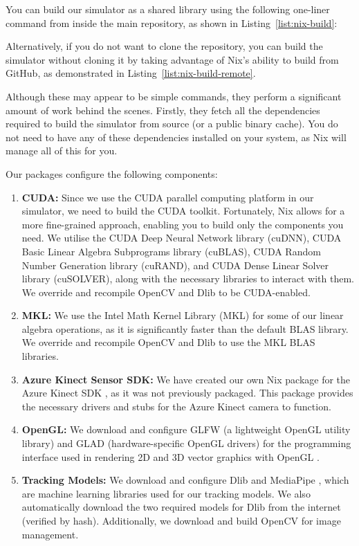 You can build our simulator as a shared library using the following one-liner command from inside the main repository, as shown in Listing~\ref{list:nix-build}:

Alternatively, if you do not want to clone the repository, you can build the simulator without cloning it by taking advantage of Nix's ability to build from GitHub, as demonstrated in Listing~\ref{list:nix-build-remote}.

Although these may appear to be simple commands, they perform a significant amount of work behind the scenes. Firstly, they fetch all the dependencies required to build the simulator from source (or a public binary cache). You do not need to have any of these dependencies installed on your system, as Nix will manage all of this for you.

Our packages configure the following components:
\begin{enumerate}
	\item \textbf{CUDA:} Since we use the CUDA parallel computing platform \cite{4541126} in our simulator, we need to build the CUDA toolkit. Fortunately, Nix allows for a more fine-grained approach, enabling you to build only the components you need. We utilise the CUDA Deep Neural Network library (cuDNN), CUDA Basic Linear Algebra Subprograms library (cuBLAS), CUDA Random Number Generation library (cuRAND), and CUDA Dense Linear Solver library (cuSOLVER), along with the necessary libraries to interact with them. We override and recompile OpenCV and Dlib to be CUDA-enabled.

	\item \textbf{MKL:} We use the Intel Math Kernel Library (MKL) \cite{Wang2014} for some of our linear algebra operations, as it is significantly faster than the default BLAS library. We override and recompile OpenCV and Dlib to use the MKL BLAS libraries.

	\item \textbf{Azure Kinect Sensor SDK:} We have created our own Nix package for the Azure Kinect SDK \cite{noauthor_microsoftazure-kinect-sensor-sdk_2024}, as it was not previously packaged. This package provides the necessary drivers and stubs for the Azure Kinect camera to function.

	\item \textbf{OpenGL:} We download and configure GLFW \cite{noauthor_glfwglfw_2024} (a lightweight OpenGL utility library) and GLAD \cite{herberth_dav1ddeglad_2024} (hardware-specific OpenGL drivers) for the programming interface used in rendering 2D and 3D vector graphics with OpenGL \cite{woo1999opengl}.

	\item \textbf{Tracking Models:} We download and configure Dlib \cite{dlib09} and MediaPipe \cite{lugaresi2019mediapipe}, which are machine learning libraries used for our tracking models. We also automatically download the two required models for Dlib from the internet (verified by hash). Additionally, we download and build OpenCV for image management.
\end{enumerate}

